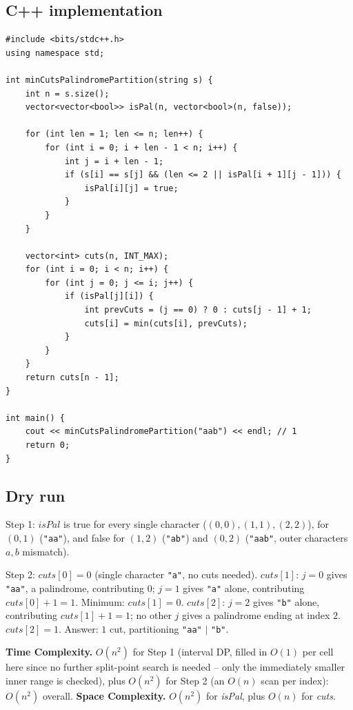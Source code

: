 \subsection*{C++ implementation}

\begin{lstlisting}
#include <bits/stdc++.h>
using namespace std;

int minCutsPalindromePartition(string s) {
    int n = s.size();
    vector<vector<bool>> isPal(n, vector<bool>(n, false));

    for (int len = 1; len <= n; len++) {
        for (int i = 0; i + len - 1 < n; i++) {
            int j = i + len - 1;
            if (s[i] == s[j] && (len <= 2 || isPal[i + 1][j - 1])) {
                isPal[i][j] = true;
            }
        }
    }

    vector<int> cuts(n, INT_MAX);
    for (int i = 0; i < n; i++) {
        for (int j = 0; j <= i; j++) {
            if (isPal[j][i]) {
                int prevCuts = (j == 0) ? 0 : cuts[j - 1] + 1;
                cuts[i] = min(cuts[i], prevCuts);
            }
        }
    }
    return cuts[n - 1];
}

int main() {
    cout << minCutsPalindromePartition("aab") << endl; // 1
    return 0;
}
\end{lstlisting}

\subsection*{Dry run}


Step 1: $\textit{isPal}$ is true for every single character
($(0,0),(1,1),(2,2)$), for $(0,1)$ (\texttt{"aa"}), and false for
$(1,2)$ (\texttt{"ab"}) and $(0,2)$ (\texttt{"aab"}, outer characters
$a,b$ mismatch).

Step 2: $\textit{cuts}[0]=0$ (single character \texttt{"a"}, no cuts
needed). $\textit{cuts}[1]$: $j=0$ gives \texttt{"aa"}, a palindrome,
contributing $0$; $j=1$ gives \texttt{"a"} alone, contributing
$\textit{cuts}[0]+1=1$. Minimum: $\textit{cuts}[1]=0$.
$\textit{cuts}[2]$: $j=2$ gives \texttt{"b"} alone, contributing
$\textit{cuts}[1]+1=1$; no other $j$ gives a palindrome ending at
index $2$. $\textit{cuts}[2]=1$. Answer: $1$ cut, partitioning
\texttt{"aa"} $\mid$ \texttt{"b"}.

\begin{complexitybox}
\textbf{Time Complexity.} $O(n^2)$ for Step 1 (interval DP, filled in
$O(1)$ per cell here since no further split-point search is needed --
only the immediately smaller inner range is checked), plus $O(n^2)$ for
Step 2 (an $O(n)$ scan per index): $O(n^2)$ overall.
\textbf{Space Complexity.} $O(n^2)$ for \textit{isPal}, plus $O(n)$ for
\textit{cuts}.
\end{complexitybox}

